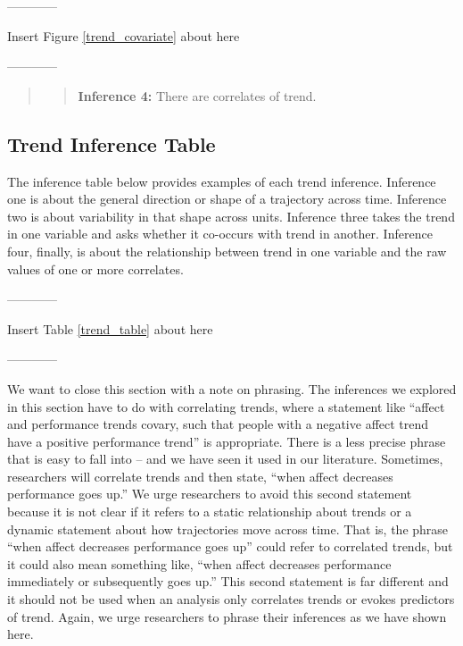 \documentclass[english,,man]{apa6}
\theoremstyle{definition}
\theoremstyle{definition}
\theoremstyle{definition}
\theoremstyle{remark}
\begin{document}
\begin{center}

------------

Insert Figure \ref{trend_covariate} about here

------------

\end{center}

\begin{quote}
\begin{quote}
\textbf{Inference 4:} There are correlates of trend.
\end{quote}
\end{quote}

\hypertarget{trend-inference-table}{%
\subsection{Trend Inference Table}\label{trend-inference-table}}

The inference table below provides examples of each trend inference.
Inference one is about the general direction or shape of a trajectory
across time. Inference two is about variability in that shape across
units. Inference three takes the trend in one variable and asks whether
it co-occurs with trend in another. Inference four, finally, is about
the relationship between trend in one variable and the raw values of one
or more correlates.

\begin{center}

------------

Insert Table \ref{trend_table} about here

------------

\end{center}

We want to close this section with a note on phrasing. The inferences we
explored in this section have to do with correlating trends, where a
statement like \enquote{affect and performance trends covary, such that
people with a negative affect trend have a positive performance trend}
is appropriate. There is a less precise phrase that is easy to fall into
-- and we have seen it used in our literature. Sometimes, researchers
will correlate trends and then state, \enquote{when affect decreases
performance goes up.} We urge researchers to avoid this second statement
because it is not clear if it refers to a static relationship about
trends or a dynamic statement about how trajectories move across time.
That is, the phrase \enquote{when affect decreases performance goes up}
could refer to correlated trends, but it could also mean something like,
\enquote{when affect decreases performance immediately or subsequently
goes up.} This second statement is far different and it should not be
used when an analysis only correlates trends or evokes predictors of
trend. Again, we urge researchers to phrase their inferences as we have
shown here.
\end{document}
